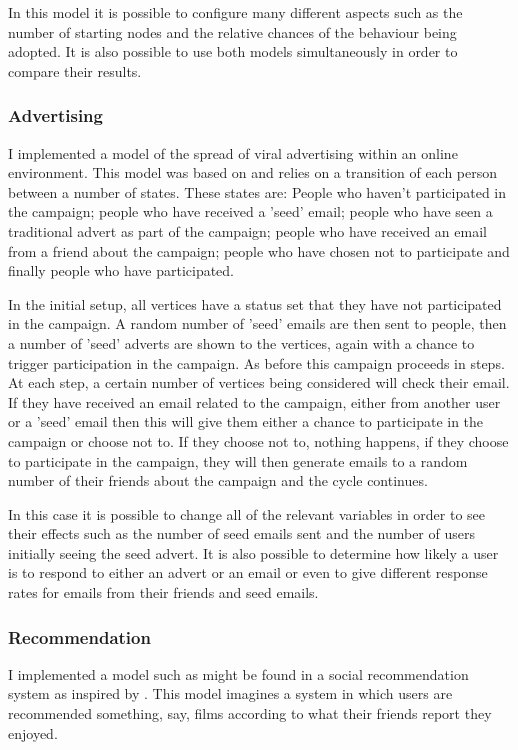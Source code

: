 \documentclass[12pt,a4paper]{article}
\begin{document}
In this model it is possible to configure many different aspects such as the number of starting nodes and the relative chances of the behaviour being adopted. It is also possible to use both models simultaneously in order to compare their results.

\subsubsection{Advertising}

I implemented a model of the spread of viral advertising within an online environment. This model was based on \cite{van2010viral} and relies on a transition of each person between a number of states. These states are: People who haven't participated in the campaign; people who have received a 'seed' email; people who have seen a traditional advert as part of the campaign;  people who have received an email from a friend about the campaign; people who have chosen not to participate and finally people who have participated.

In the initial setup, all vertices have a status set that they have not participated in the campaign. A random number of 'seed' emails are then sent to people, then a number of 'seed' adverts are shown to the vertices, again with a chance to trigger participation in the campaign. As before this campaign proceeds in steps. At each step, a certain number of vertices being considered will check their email. If they have received an email related to the campaign, either from another user or a 'seed' email then this will give them either a chance to participate in the campaign or choose not to. If they choose not to, nothing happens, if they choose to participate in the campaign, they will then generate emails to a random number of their friends about the campaign and the cycle continues.

In this case it is possible to change all of the relevant variables in order to see their effects such as the number of seed emails sent and the number of users initially seeing the seed advert. It is also possible to determine how likely a user is to respond to either an advert or an email or even to give different response rates for emails from their friends and seed emails.

\subsubsection{Recommendation}

I implemented a model such as might be found in a social recommendation system as inspired by \cite{walter2008model}. This model imagines a system in which users are recommended something, say, films according to what their friends report they enjoyed.
\end{document}
